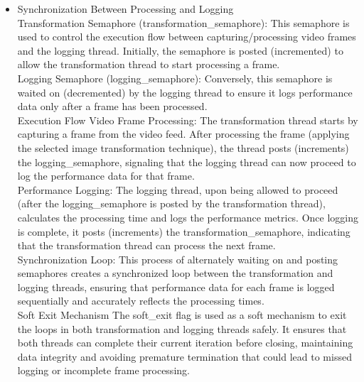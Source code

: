 \documentclass[a4paper,11pt]{article}%
\newenvironment{qanda}{\setlength{\parindent}{0pt}}{\bigskip}
\begin{document}
\begin{qanda}
\begin{enumerate}
\begin{enumerate}
\begin{itemize}
\begin{itemize}
						            \item Synchronization Between Processing and Logging\\
						                  Transformation Semaphore (transformation\_semaphore): This semaphore is used to control the execution flow between capturing/processing video frames and the logging thread. Initially, the semaphore is posted (incremented) to allow the transformation thread to start processing a frame.\\
						                  Logging Semaphore (logging\_semaphore): Conversely, this semaphore is waited on (decremented) by the logging thread to ensure it logs performance data only after a frame has been processed.\\
						                  Execution Flow
						                  Video Frame Processing: The transformation thread starts by capturing a frame from the video feed. After processing the frame (applying the selected image transformation technique), the thread posts (increments) the logging\_semaphore, signaling that the logging thread can now proceed to log the performance data for that frame.\\

						                  Performance Logging: The logging thread, upon being allowed to proceed (after the logging\_semaphore is posted by the transformation thread), calculates the processing time and logs the performance metrics. Once logging is complete, it posts (increments) the transformation\_semaphore, indicating that the transformation thread can process the next frame.\\

						                  Synchronization Loop: This process of alternately waiting on and posting semaphores creates a synchronized loop between the transformation and logging threads, ensuring that performance data for each frame is logged sequentially and accurately reflects the processing times.\\

						                  Soft Exit Mechanism
						                  The soft\_exit flag is used as a soft mechanism to exit the loops in both transformation and logging threads safely. It ensures that both threads can complete their current iteration before closing, maintaining data integrity and avoiding premature termination that could lead to missed logging or incomplete frame processing.
					            \end{itemize}


\end{itemize}
\end{enumerate}
\end{enumerate}
\end{qanda}
\end{document}
